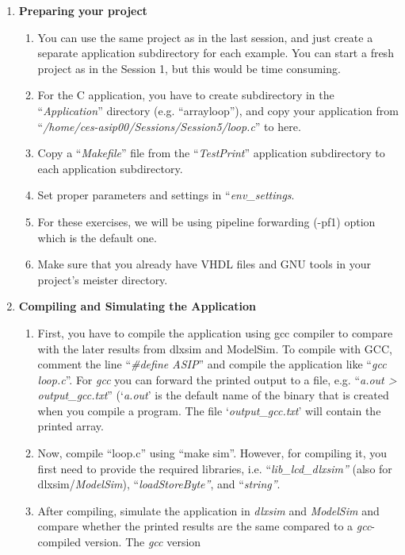 \begin{enumerate}
\item \textbf{Preparing your project}
	\begin{enumerate}
		\item
		You can use the same project as in the last session, and just create
		a separate application subdirectory for each example. You can start
		a fresh project as in the Session 1, but this would be time
		consuming.
		\item
		For the C application, you have to create subdirectory in the
		``\emph{Application}'' directory (e.g. ``arrayloop''), and copy your
		application from ``\emph{/home/ces-asip00/Sessions/Session5/loop.c}'' to
		here.
		\item
		Copy a ``\emph{Makefile}'' file from the ``\emph{TestPrint}''
		application subdirectory to each application subdirectory.
		\item
		Set proper parameters and settings in ``\emph{env\_settings}.
		\item
		For these exercises, we will be using pipeline forwarding (-pf1)
		option which is the default one.
		\item
		Make sure that you already have VHDL files and GNU tools in your
		project's meister directory.
	\end{enumerate}
\item \textbf{Compiling and Simulating the Application}
	\begin{enumerate}
		\item
		First, you have to compile the application using gcc compiler to
		compare with the later results from dlxsim and ModelSim. To compile
		with GCC, comment the line ``\emph{\#define ASIP}'' and compile the
		application like ``\emph{gcc loop.c}''. For \emph{gcc} you can
		forward the printed output to a file, e.g. ``\emph{a.out
			\textgreater{} output\_gcc.txt}'' (`\emph{a.out}' is the default
		name of the binary that is created when you compile a program. The
		file `\emph{output\_gcc.txt}' will contain the printed array.
		\item
		Now, compile ``loop.c'' using ``make sim''. However, for compiling
		it, you first need to provide the required libraries, i.e.
		``\emph{lib\_lcd\_dlxsim''} (also for dlxsim/\emph{ModelSim}),
		``\emph{loadStoreByte''}, and ``\emph{string''}.
		\item
		After compiling, simulate the application in \emph{dlxsim} and
		\emph{ModelSim} and compare whether the printed results are the same
		compared to a \emph{gcc}-compiled version. The \emph{gcc} version

\end{enumerate}
\end{enumerate}

